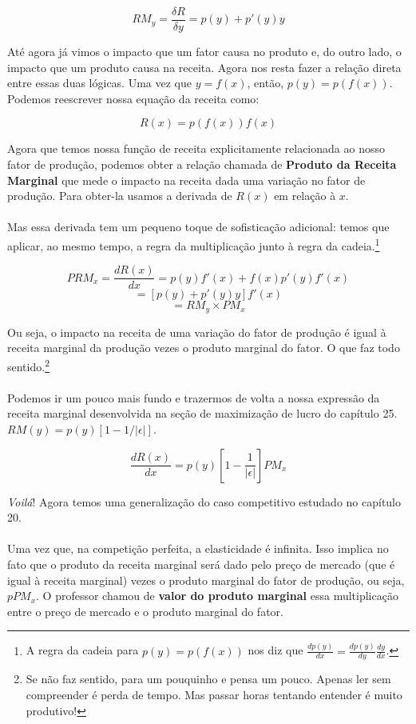 \documentclass[a4paper,11pt,oneside]{book}
\theoremstyle{definition}
\theoremstyle{break}
\begin{document}
$$ RM_y = \frac{\delta R}{\delta y} = p(y) + p'(y)y $$

Até agora já vimos o impacto que um fator causa no produto e, do outro lado, o impacto que um produto causa na receita. Agora nos resta fazer a relação direta entre essas duas lógicas. Uma vez que $y = f(x)$, então, $p(y) = p(f(x))$. Podemos reescrever nossa equação da receita como:

$$ R(x) = p(f(x))f(x) $$

Agora que temos nossa função de receita explicitamente relacionada ao nosso fator de produção, podemos obter a relação chamada de \textbf{Produto da Receita Marginal} que mede o impacto na receita dada uma variação no fator de produção. Para obter-la usamos a derivada de $R(x)$ em relação à $x$. 
\\~\\
Mas essa derivada tem um pequeno toque de sofisticação adicional: temos que aplicar, ao mesmo tempo, a regra da multiplicação junto à regra da cadeia.\footnote{A regra da cadeia para $p(y) = p(f(x))$ nos diz que $\frac{d p(y) }{d x} = \frac{d p(y)}{d y} \frac{d y}{d x} $.}

$$ PRM_x = \frac{d R(x)}{d x} = p(y)f'(x) + f(x)p'(y)f'(x) $$
$$ = [p(y) + p'(y)y]f'(x) $$
$$ = RM_y \times PM_x $$

Ou seja, o impacto na receita de uma variação do fator de produção é igual à receita marginal da produção vezes o produto marginal do fator. O que faz todo sentido.\footnote{Se não faz sentido, para um pouquinho e pensa um pouco. Apenas ler sem compreender é perda de tempo. Mas passar horas tentando entender é muito produtivo!}
\\~\\
Podemos ir um pouco mais fundo e trazermos de volta a nossa expressão da receita marginal desenvolvida na seção de maximização de lucro do capítulo 25. $RM(y) = p(y) \left[ 1 - 1/|\epsilon| \right]$.

$$ \frac{d R(x)}{d x} = p(y) \left[ 1 - \frac{1}{|\epsilon|} \right] PM_x $$

\textit{Voilá}! Agora temos uma generalização do caso competitivo estudado no capítulo 20. 
\\~\\
Uma vez que, na competição perfeita, a elasticidade é infinita. Isso implica no fato que o produto da receita marginal será dado pelo preço de mercado (que é igual à receita marginal) vezes o produto marginal do fator de produção, ou seja, $p PM_x$. O professor chamou de \textbf{valor do produto marginal} essa multiplicação entre o preço de mercado e o produto marginal do fator.
\end{document}
